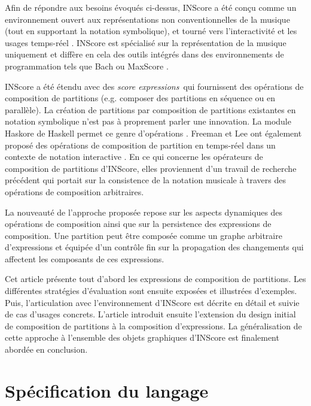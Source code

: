\documentclass{article}
\newcommand{\sExprs}{\emph{score expressions}}
\begin{document}
Afin de répondre aux besoins évoqués ci-dessus, INScore \cite{Fober:12a,fober14c} a été conçu comme un environnement ouvert aux représentations non conventionnelles de la musique (tout en supportant la notation symbolique), et tourné vers l'interactivité et les usages temps-réel \cite{Fober:13b, Fober:14b}. INScore est spécialisé sur la représentation de la musique uniquement et diffère en cela des outils intégrés dans des environnements de programmation tels que Bach \cite{agostini12b} ou MaxScore \cite{didko08}. 

INScore a été étendu avec des \sExprs\ qui fournissent des opérations de composition de partitions (e.g. composer des partitions en séquence ou en parallèle). La création de partitions par composition de partitions existantes en notation symbolique n'est pas à proprement parler une innovation. La module Haskore de Haskell permet ce genre d'opérations  \cite{haskore}. Freeman et Lee ont également proposé des opérations de composition de partition en temps-réel dans un contexte de notation interactive \cite{Lee:2013}. En ce qui concerne les opérateurs de composition de partitions d'INScore, elles proviennent d'un travail de recherche précédent \cite{fober12b} qui portait sur la consistence de la notation musicale à travers des opérations de composition arbitraires.

La nouveauté de l'approche proposée repose sur les aspects dynamiques des opérations de composition ainsi que sur la persistence des expressions de composition. Une partition peut être composée comme un graphe arbitraire d'expressions et équipée d'un contrôle fin sur la propagation des changements qui affectent les composants de ces expressions.

Cet article présente tout d'abord les expressions de composition de partitions. Les différentes stratégies d'évaluation sont ensuite exposées et illustrées d'exemples. Puis, l'articulation avec l'environnement d'INScore est décrite en détail et suivie de cas d'usages concrets. L'article introduit ensuite l'extension du design initial de composition de partitions à la composition d'expressions. La généralisation de cette approche à l'ensemble des objets graphiques d'INScore est finalement abordée en conclusion.


\section{Spécification du langage}\label{language}
\end{document}
